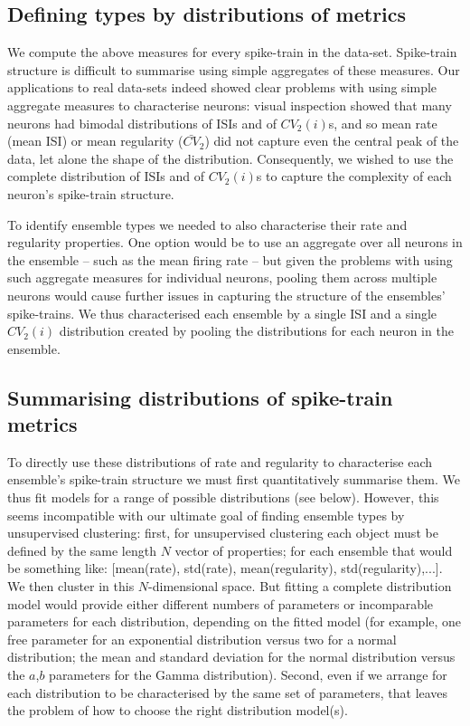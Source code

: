 \documentclass[11pt,a4paper]{article}
\begin{document}
\subsection{Defining types by distributions of metrics}
We compute the above measures for every spike-train in the data-set. Spike-train structure is difficult to summarise using simple aggregates of these measures. Our applications to real data-sets indeed showed clear problems with using simple aggregate measures to characterise neurons: visual inspection showed that many neurons had bimodal distributions of ISIs and of $CV_2(i)$s, and so mean rate (mean ISI) or mean regularity ($\bar{CV}_2$) did not capture even the central peak of the data, let alone the shape of the distribution.  Consequently, we wished to use the complete distribution of ISIs and of $CV_2(i)$s to capture the complexity of each neuron's spike-train structure.

To identify ensemble types we needed to also characterise their rate and regularity properties.  One option would be to use an aggregate over all neurons in the ensemble -- such as the mean firing rate -- but given the problems with using such aggregate measures for individual neurons, pooling them across multiple neurons would cause further issues in capturing the structure of the ensembles' spike-trains. We thus characterised each ensemble by a single ISI and a single $CV_2(i)$ distribution created by pooling the distributions for each neuron in the ensemble.


\subsection{Summarising distributions of spike-train metrics}
To directly use these distributions of rate and regularity to characterise each ensemble's spike-train structure we must first quantitatively summarise them. We thus fit models for a range of possible distributions (see below). However, this seems incompatible with our ultimate goal of finding ensemble types by unsupervised clustering: first, for unsupervised clustering each object must be defined by the same length $N$ vector of properties; for each ensemble that would be something like: [mean(rate), std(rate), mean(regularity), std(regularity),...]. We then cluster in this $N$-dimensional space. But fitting a complete distribution model would provide either different numbers of parameters or incomparable parameters for each distribution, depending on the fitted model (for example, one free parameter for an exponential distribution versus two for a normal distribution; the mean and standard deviation for the normal distribution versus the $a$,$b$ parameters for the Gamma distribution). Second, even if we arrange for each distribution to be characterised by the same set of parameters, that leaves the problem of how to choose the right distribution model(s).
\end{document}
